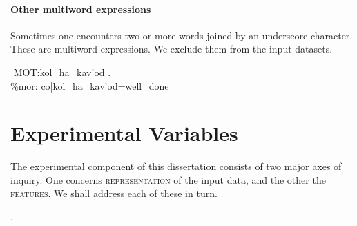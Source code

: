 \paragraph{Other multiword expressions} Sometimes one encounters two or more words joined 
by an underscore character. These are multiword expressions. We exclude them from
the input datasets. 
\begin{exe}
\ex \begin{tabbing}
\hspace{0.6in} \= \hspace{5.5in} \kill
\textsf{\*MOT:}\>\textsf{kol\_ha\_kav\a'{o}d .} \\
\textsf{\%mor:} \> \textsf{co|kol\_ha\_kav\a'{o}d=well\_done}
\end{tabbing}
\end{exe}


\section{Experimental Variables}\label{sec:expvars}
The experimental component of this dissertation consists of two major axes of inquiry. 
One concerns \textsc{representation} of the input data, and the other the \textsc{features}. 
We shall address each of these in turn. 



. 



 
